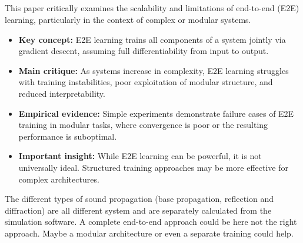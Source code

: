 		\subsection{}
			This paper critically examines the scalability and limitations of end-to-end (E2E) learning, particularly in the context of complex or modular systems.
			
			\begin{itemize}[itemsep=1mm, parsep=0pt]
				\item \textbf{Key concept:} E2E learning trains all components of a system jointly via gradient descent, assuming full differentiability from input to output.
				\item \textbf{Main critique:} As systems increase in complexity, E2E learning struggles with training instabilities, poor exploitation of modular structure, and reduced interpretability.
				\item \textbf{Empirical evidence:} Simple experiments demonstrate failure cases of E2E training in modular tasks, where convergence is poor or the resulting performance is suboptimal.
				\item \textbf{Important insight:} While E2E learning can be powerful, it is not universally ideal. Structured training approaches may be more effective for complex architectures.
			\end{itemize}
			
			The different types of sound propagation (base propagation, reflection and diffraction) are all different system and are separately calculated from the simulation software. A complete end-to-end approach could be here not the right approach. Maybe a modular architecture or even a separate training could help.
			
